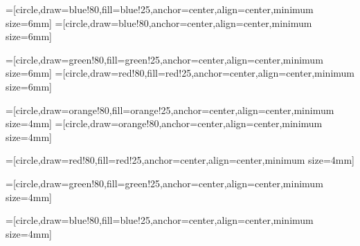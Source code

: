 \RequirePackage{snapshot} %





\usepackage{tikz,amssymb,array,delarray,verbatim,alltt,epsfig,float,amsthm}
\usepackage{graphicx,algorithmicx,algorithm,algpseudocode,xspace,xcolor}
\usepackage{url}
\usepackage{epsf,epsfig,subfigure,dsfont}
\usepackage{amssymb,amsmath}
\usepackage{pgf,amsbsy,amsfonts,amsmath,subfigure,multicol,natbib}
\usepackage{graphicx,xspace,color,cancel}
\usepackage{tikz}
\usetikzlibrary{arrows,shapes,backgrounds,through,shadows,snakes}
\usetikzlibrary{decorations.pathmorphing}
\usetikzlibrary{calc}
\usetikzlibrary{matrix}

\graphicspath{{./images/}{./figures/}{../matlab/}{../matlab/figures/}{../cup_first_edition/figures/}{./../codeOO/misc/}{../cup_first_edition_corrections/figures/}{./../codeOO/DemosExercises/}}


\def\firstcircle{(-0.25,0) circle (0.5)}
\def\secondcircle{(0.25,0) circle (0.5)}
\def\thirdcircle{(0.75,0) circle (0.5)}


=[circle,draw=blue!80,fill=blue!25,anchor=center,align=center,minimum size=6mm]
=[circle,draw=blue!80,anchor=center,align=center,minimum size=6mm]

=[circle,draw=green!80,fill=green!25,anchor=center,align=center,minimum size=6mm]
=[circle,draw=red!80,fill=red!25,anchor=center,align=center,minimum size=6mm]

=[circle,draw=orange!80,fill=orange!25,anchor=center,align=center,minimum size=4mm]
=[circle,draw=orange!80,anchor=center,align=center,minimum size=4mm]

=[circle,draw=red!80,fill=red!25,anchor=center,align=center,minimum size=4mm]

=[circle,draw=green!80,fill=green!25,anchor=center,align=center,minimum size=4mm]

=[circle,draw=blue!80,fill=blue!25,anchor=center,align=center,minimum size=4mm]

